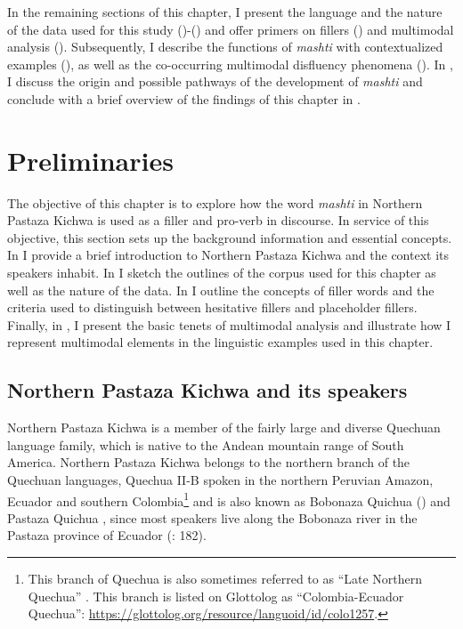 \documentclass[output=paper]{langscibook}
\begin{document}
In the remaining sections of this chapter, I present the language and the nature of the data used for this study ()-() and offer primers on fillers () and multimodal analysis (). Subsequently, I describe the functions of \textit{mashti} with contextualized examples (), as well as the co-occurring multimodal disfluency phenomena (). In , I discuss the origin and possible pathways of the development of \textit{mashti} and conclude with a brief overview of the findings of this chapter in .

\section{Preliminaries} 
\label{sec:rice:2}
The objective of this chapter is to explore how the word \textit{mashti} in Northern Pastaza Kichwa is used as a filler and pro-verb in discourse. In service of this objective, this section sets up the background information and essential concepts. In  I provide a brief introduction to Northern Pastaza Kichwa and the context its speakers inhabit. In  I sketch the outlines of the corpus used for this chapter as well as the nature of the data. In  I outline the concepts of filler words and the criteria used to distinguish between hesitative fillers and placeholder fillers. Finally, in , I present the basic tenets of multimodal analysis and illustrate how I represent multimodal elements in the linguistic examples used in this chapter. 

\subsection{Northern Pastaza Kichwa and its speakers} 
\label{sec:rice:2.1}
Northern Pastaza Kichwa is a member of the fairly large and diverse Quechuan language family, which is native to the Andean mountain range of South America. Northern Pastaza Kichwa belongs to the northern branch of the Quechuan languages, Quechua II-B \citep{Torero} spoken in the northern Peruvian Amazon, Ecuador and southern Colombia\footnote{This branch of Quechua is also sometimes referred to as “Late Northern Quechua” \citep{Muysken2021}. This branch is listed on Glottolog as “Colombia-Ecuador Quechua”: \url{https://glottolog.org/resource/languoid/id/colo1257}.}  and is also known as Bobonaza Quichua (\citealt{Orr1965}) and Pastaza Quichua \citep{Orr1991}, since most speakers live along the Bobonaza river in the Pastaza province of Ecuador (\citealt{Nathan2014}: 182).
\end{document}
